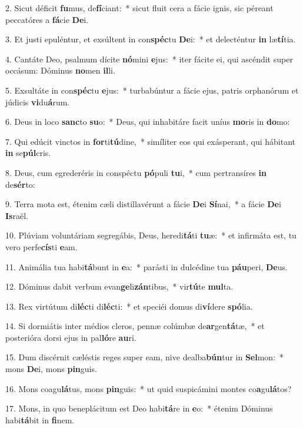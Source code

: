 2. Sicut déficit \textbf{fu}mus, de\textbf{fí}ciant:~*  sicut fluit cera a fácie ignis, sic péreant peccatóres a \textbf{fá}cie \textbf{De}i.\

3. Et justi epuléntur, et exsúltent in con\textbf{spéc}tu \textbf{De}i:~*  et delecténtur \textbf{in} læ\textbf{tí}tia.\

4. Cantáte Deo, psalmum dícite \textbf{nó}mini \textbf{e}jus:~*  iter fácite ei, qui ascéndit super occásum: Dóminus \textbf{no}men \textbf{il}li.\

5. Exsultáte in con\textbf{spéc}tu \textbf{e}jus:~*  turbabúntur a fácie ejus, patris orphanórum et júdicis \textbf{vi}du\textbf{á}rum.\

6. Deus in loco \textbf{sanc}to \textbf{su}o:~*  Deus, qui inhabitáre facit uníus \textbf{mo}ris in \textbf{do}mo:\

7. Qui edúcit vinctos in \textbf{for}ti\textbf{tú}dine,~*  simíliter eos qui exásperant, qui hábitant \textbf{in} se\textbf{púl}cris.\

8. Deus, cum egrederéris in conspéctu \textbf{pó}puli \textbf{tu}i,~*  cum pertransíres \textbf{in} de\textbf{sér}to:\

9. Terra mota est, étenim cæli distillavérunt a fácie \textbf{De}i \textbf{Sí}nai,~*  a fácie \textbf{De}i \textbf{Is}raël.\

10. Plúviam voluntáriam segregábis, Deus, heredi\textbf{tá}ti \textbf{tu}æ:~*  et infirmáta est, tu vero perfe\textbf{cís}ti \textbf{e}am.\

11. Animália tua habi\textbf{tá}bunt in \textbf{e}a:~*  parásti in dulcédine tua \textbf{páu}peri, \textbf{De}us.\

12. Dóminus dabit verbum evan\textbf{ge}li\textbf{zán}tibus,~*  vir\textbf{tú}te \textbf{mul}ta.\

13. Rex virtútum di\textbf{léc}ti di\textbf{léc}ti:~*  et speciéi domus di\textbf{ví}dere \textbf{spó}lia.\

14. Si dormiátis inter médios cleros, pennæ colúmbæ de\textbf{ar}gen\textbf{tá}tæ,~*  et posterióra dorsi ejus in pal\textbf{ló}re \textbf{au}ri.\

15. Dum discérnit cæléstis reges super eam, nive dealba\textbf{bún}tur in \textbf{Sel}mon:~*  mons \textbf{De}i, mons \textbf{pin}guis.\

16. Mons coagu\textbf{lá}tus, mons \textbf{pin}guis:~*  ut quid suspicámini montes co\textbf{a}gu\textbf{lá}tos?\

17. Mons, in quo beneplácitum est Deo habi\textbf{tá}re in \textbf{e}o:~*  étenim Dóminus habi\textbf{tá}bit in \textbf{fi}nem.\

